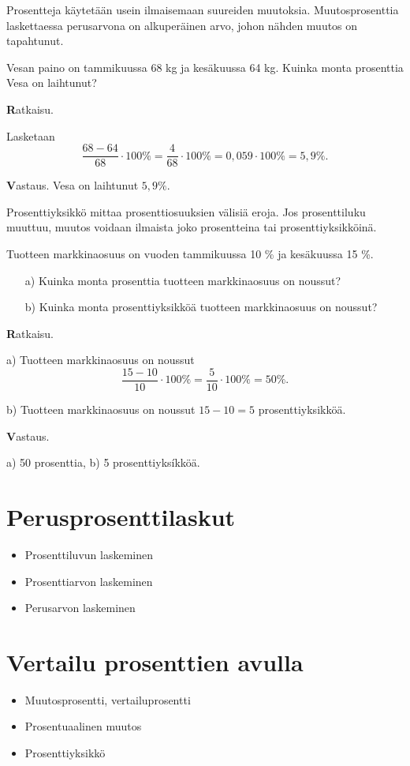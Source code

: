 Prosentteja käytetään usein ilmaisemaan suureiden muutoksia. Muutosprosenttia laskettaessa perusarvona on alkuperäinen arvo, johon nähden muutos on tapahtunut.

\begin{esimerkki}
    Vesan paino on tammikuussa 68 kg ja kesäkuussa 64 kg. Kuinka monta prosenttia Vesa on laihtunut?

    {\textbf Ratkaisu.}

    Lasketaan 
    \[
    \frac{68-64}{68}\cdot 100\% = \frac{4}{68} \cdot 100\%=0,059\cdot 100\% =5,9\%.
    \]
    
    {\textbf Vastaus.}
    Vesa on laihtunut $5,9\%$.
\end{esimerkki}


Prosenttiyksikkö mittaa prosenttiosuuksien välisiä eroja. Jos prosenttiluku muuttuu, muutos voidaan ilmaista joko prosentteina tai prosenttiyksikköinä.


\begin{esimerkki}
    Tuotteen markkinaosuus on vuoden tammikuussa 10 \% ja kesäkuussa 15 \%. 
    \begin{enumerate}
    \item[a)]
    Kuinka monta prosenttia tuotteen markkinaosuus on noussut?
    
    \item[b)] Kuinka monta prosenttiyksikköä tuotteen markkinaosuus on noussut?
    \end{enumerate}
    
    {\textbf Ratkaisu.} 
    
    a) Tuotteen markkinaosuus on noussut
    \[
    \frac{15-10}{10} \cdot 100 \%= \frac{5}{10}\cdot 100\% = 50\%.
    \]
    
    b) Tuotteen markkinaosuus on noussut $15-10=5$ prosenttiyksikköä. 
    
    {\textbf Vastaus.}
    
    a) 50 prosenttia, b) 5 prosenttiyksíkköä.
\end{esimerkki}




\section{Perusprosenttilaskut}

\begin{itemize}
	\item Prosenttiluvun laskeminen
	\item Prosenttiarvon laskeminen
	\item Perusarvon laskeminen
\end{itemize}

\section{Vertailu prosenttien avulla}

\begin{itemize}
	\item Muutosprosentti, vertailuprosentti
	\item Prosentuaalinen muutos
	\item Prosenttiyksikkö
\end{itemize}
